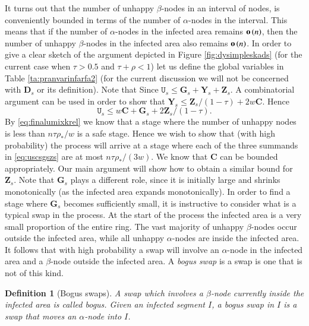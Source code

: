 \documentclass[11pt]{article}
\theoremstyle{plain}
\newtheorem{defi}[thm]{Definition}
\numberwithin{equation}{subsection}
\newcommand{\smo}[1]{\mathop{\bf o}\/\left({#1}\right)}
\newcommand{\ZZ}{\mathbf{Z}}
\newcommand{\DD}{\mathbf{D}}
\newcommand{\GG}{\mathbf{G}}
\newcommand{\YY}{\mathbf{Y}}
\newcommand{\CC}{\mathbf{C}}
\begin{document}
It turns out that the number of unhappy $\beta$-nodes in an interval of nodes, is conveniently bounded
in terms of the number of $\alpha$-nodes in the interval.
This means that  if the number of $\alpha$-nodes in the infected area remains $\smo{n}$, then
the number of unhappy $\beta$-nodes in the infected area also remains $\smo{n}$.
In order to give a clear sketch of the argument depicted in Figure \ref{fig:dysimpleskads}
(for the current case when $\tau>0.5$ and $\tau+\rho<1$)
let us define the global variables in Table \ref{ta:pranvarinfarfa2}
(for the current discussion we will not be concerned with $\DD_s$ or its definition).
Note that Since $\mathtt{U}_s\leq \GG_s + \YY_s + \ZZ_s$.
A combinatorial argument can be used in order to show that $\YY_s\leq  \ZZ_s/(1-\tau)+2w\CC$.
Hence 
\begin{equation}\label{eq:uscsgszs}
\mathtt{U}_s\leq w\CC  + \GG_s + 2\ZZ_s /(1-\tau).
\end{equation}
By \eqref{eq:finalumixkrel}  we know that a stage where the number of unhappy nodes
is less than $n\tau\rho_{\ast}/w$ is a safe stage.
Hence we wish to show that (with high probability) 
the process will arrive at a stage where  each of the three
summands in \eqref{eq:uscsgszs} are at most
$n\tau\rho_{\ast}/(3w)$. We know that $\CC$ 
can be bounded appropriately. Our main argument will show
how to obtain a similar bound for $\ZZ_s$. 
Note that $\GG_s$ plays a different role,
since it is initially large and shrinks monotonically (as the infected area expands monotonically). 
In order to find a stage where $\GG_s$ becomes sufficiently small, it is instructive to consider what is a typical swap
in the process.
At the start of the process the infected area is a very small proportion of the
entire ring. The vast majority of unhappy $\beta$-nodes occur outside
the infected area, while all unhappy $\alpha$-nodes are inside the infected area.
It follows that with high probability a 
swap will involve an $\alpha$-node in the infected
area and a $\beta$-node outside the infected area. A {\em bogus swap} is a swap is one that is not of this kind.

\begin{defi}[Bogus swaps]
A swap
which involves a $\beta$-node 
currently inside the infected area is called bogus. 
Given an infected segment $I$, a bogus swap in $I$ is a
swap that moves an $\alpha$-node into $I$.
\end{defi}
\end{document}
